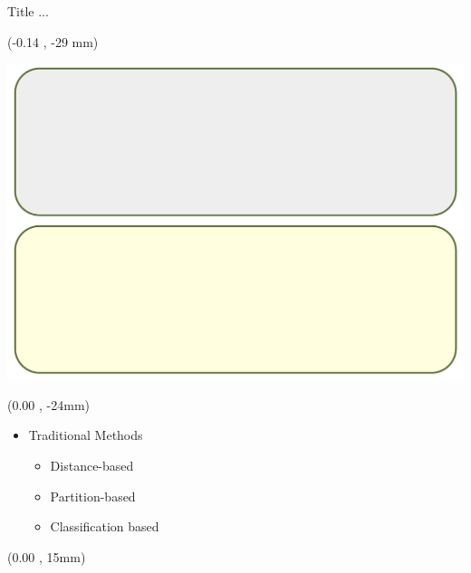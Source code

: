\documentclass[usenames,dvipsnames, xcolor=table, 9pt]{beamer}
\begin{document}
\begin{frame}{Title ...}
	
	
	\begin{textblock*}{\paperwidth}(-0.14 \paperwidth, -29 mm)%
		
		\hfill \includegraphics [width=0.85\paperwidth]{./pics/bckg01.pdf}
	\end{textblock*}
	
	\begin{textblock*}{0.8\paperwidth}(0.00 \paperwidth, -24mm)%
		\begin{itemize}
		\item[] Traditional Methods
		\vspace{0.3 cm}
		\small
		
		\begin{itemize}
			
		
			\item Distance-based
				\vspace{0.2 cm}
			\item Partition-based
				\vspace{0.2 cm}
		    \item Classification based
			
		\end{itemize}
	
\end{itemize}
		
	\end{textblock*}
	
	\begin{textblock*}{0.8\paperwidth}(0.00 \paperwidth, 15mm)%
		
		\begin{itemize}
			

\end{itemize}
\end{textblock*}
\end{frame}
\end{document}
